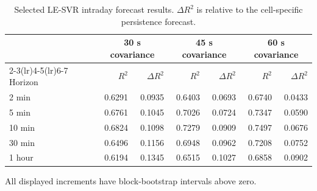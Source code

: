 
\begin{table}[!b]
\centering
\caption{Selected LE-SVR intraday forecast results.  $\Delta R^2$ is relative
to the cell-specific persistence forecast.}
\label{tab:forecast_map}
\small
\begin{tabular}{lrrrrrr}
\toprule
 & \multicolumn{2}{c}{30 s covariance} &
\multicolumn{2}{c}{45 s covariance} &
\multicolumn{2}{c}{60 s covariance}\\
\cmidrule(lr){2-3}\cmidrule(lr){4-5}\cmidrule(lr){6-7}
Horizon & $R^2$ & $\Delta R^2$ & $R^2$ & $\Delta R^2$ & $R^2$ & $\Delta R^2$\\
\midrule
2 min & 0.6291 & 0.0935 & 0.6403 & 0.0693 & 0.6740 & 0.0433\\
5 min & 0.6761 & 0.1045 & 0.7026 & 0.0724 & 0.7347 & 0.0590\\
10 min & 0.6824 & 0.1098 & 0.7279 & 0.0909 & 0.7497 & 0.0676\\
30 min & 0.6496 & 0.1156 & 0.6948 & 0.0962 & 0.7208 & 0.0752\\
1 hour & 0.6194 & 0.1345 & 0.6515 & 0.1027 & 0.6858 & 0.0902\\
\bottomrule
\end{tabular}
\begin{minipage}{0.94\linewidth}\footnotesize
All displayed increments have block-bootstrap intervals above zero.
\end{minipage}
\end{table}
